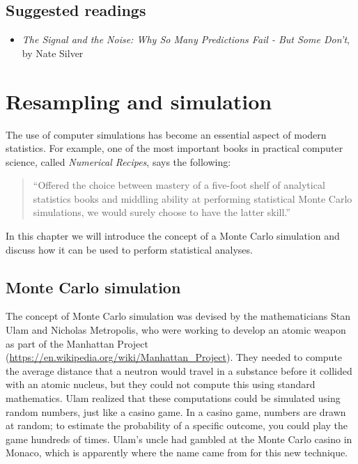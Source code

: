 \documentclass[]{book}
\providecommand{\tightlist}{%
  \setlength{\itemsep}{0pt}\setlength{\parskip}{0pt}}
\theoremstyle{definition}
\theoremstyle{definition}
\theoremstyle{definition}
\theoremstyle{remark}
\begin{document}
\section{Suggested readings}\label{suggested-readings-4}

\begin{itemize}
\tightlist
\item
  \emph{The Signal and the Noise: Why So Many Predictions Fail - But
  Some Don't}, by Nate Silver
\end{itemize}

\chapter{Resampling and simulation}\label{resampling-and-simulation}

The use of computer simulations has become an essential aspect of modern
statistics. For example, one of the most important books in practical
computer science, called \emph{Numerical Recipes}, says the following:

\begin{quote}
``Offered the choice between mastery of a five-foot shelf of analytical
statistics books and middling ability at performing statistical Monte
Carlo simulations, we would surely choose to have the latter skill.''
\end{quote}

In this chapter we will introduce the concept of a Monte Carlo
simulation and discuss how it can be used to perform statistical
analyses.

\section{Monte Carlo simulation}\label{monte-carlo-simulation}

The concept of Monte Carlo simulation was devised by the mathematicians
Stan Ulam and Nicholas Metropolis, who were working to develop an atomic
weapon as part of the Manhattan Project
(\url{https://en.wikipedia.org/wiki/Manhattan_Project}). They needed to
compute the average distance that a neutron would travel in a substance
before it collided with an atomic nucleus, but they could not compute
this using standard mathematics. Ulam realized that these computations
could be simulated using random numbers, just like a casino game. In a
casino game, numbers are drawn at random; to estimate the probability of
a specific outcome, you could play the game hundreds of times. Ulam's
uncle had gambled at the Monte Carlo casino in Monaco, which is
apparently where the name came from for this new technique.
\end{document}
